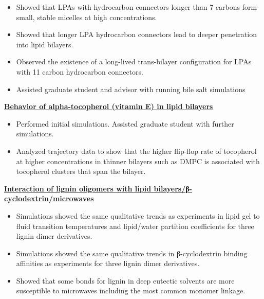 \begin{cventries}
{\begin{cvitems}
                \vspace{2pt}
                \begin{itemize}
                \item {Showed that LPAs with hydrocarbon connectors longer than 7 carbons form small, stable micelles at high concentrations.}
                \item {Showed that longer LPA hydrocarbon connectors lead to deeper penetration into lipid bilayers.}
                \item {Observed the existence of a long-lived trans-bilayer configuration for LPAs with 11 carbon hydrocarbon connectors.}
                \item {Assisted graduate student and advisor with running bile salt simulations}
                \end{itemize}
            \item {\textbf{\underline{Behavior of alpha-tocopherol (vitamin E) in lipid bilayers}}}
                \vspace{2pt}
                \begin{itemize}
                \item {Performed initial simulations. Assisted graduate student with further simulations.}
                \item {Analyzed trajectory data to show that the higher flip-flop rate of tocopherol at higher concentrations in thinner bilayers such as DMPC is associated with tocopherol clusters that span the bilayer.}
                \end{itemize}
            \item {\textbf{\underline{Interaction of lignin oligomers with lipid bilayers/β-cyclodextrin/microwaves}}}
                \vspace{2pt}
                \begin{itemize}
                    \item {Simulations showed the same qualitative trends as experiments in lipid gel to fluid transition temperatures and lipid/water partition coefficients for three lignin dimer derivatives.}
                    \item {Simulations showed the same qualitative trends in β-cyclodextrin binding affinities as experiments for three lignin dimer derivatives.}
                    \item {Showed that some bonds for lignin in deep eutectic solvents are more susceptible to microwaves including the most common monomer linkage.}
                \end{itemize}            

\end{cvitems}}
\end{cventries}
